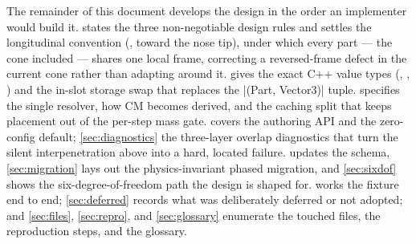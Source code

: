 The remainder of this document develops the design in the order an implementer would build it.
 states the three non-negotiable design rules and settles the longitudinal
convention (\zfwd, toward the nose tip), under which every part --- the cone included --- shares one
local frame, correcting a reversed-frame defect in the current cone rather than adapting around it.
 gives the exact C++ value types
(, , ) and the in-slot storage swap that replaces the
\cppinline|(Part, Vector3)| tuple.  specifies the single resolver, how CM becomes
derived, and the caching split that keeps placement out of the per-step mass gate.
 covers the authoring API and the zero-config default; \cref{sec:diagnostics}
the three-layer overlap diagnostics that turn the silent interpenetration above into a hard, located
failure.  updates the  schema, \cref{sec:migration} lays out the
physics-invariant phased migration, and \cref{sec:sixdof} shows the six-degree-of-freedom path the
design is shaped for.  works the  fixture end to end;
\cref{sec:deferred} records what was deliberately deferred or not adopted; and \cref{sec:files},
\cref{sec:repro}, and \cref{sec:glossary} enumerate the touched files, the reproduction steps, and
the glossary.
